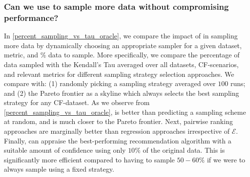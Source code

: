 % 

\subsubsection{Can we use \oracle to sample more data without compromising performance? \ \ } In \cref{percent_sampling_vs_tau_oracle}, we compare the impact of \oracle in sampling more data by dynamically choosing an appropriate sampler for a given dataset, metric, and $\%$ data to sample. 
More specifically,
we compare the percentage of data sampled with the Kendall's Tau averaged over all datasets, CF-scenarios, and relevant metrics for different sampling strategy selection approaches. We compare \oracle with: (1) randomly picking a sampling strategy averaged over $100$ runs; and (2) the Pareto frontier as a skyline which always selects the best sampling strategy for any CF-dataset. As we observe from \cref{percent_sampling_vs_tau_oracle}, \oracle is better than predicting a sampling scheme at random, and 
is
much closer to the Pareto frontier. Next, pairwise ranking approaches are marginally better than regression approaches 
irrespective of $\mathcal{E}$. Finally, \oracle can appraise the best-performing recommendation algorithm with a suitable amount of confidence using only $10\%$ of the original data. This is significantly more efficient compared to having to sample $50-60\%$ if we were to always sample using a fixed strategy.